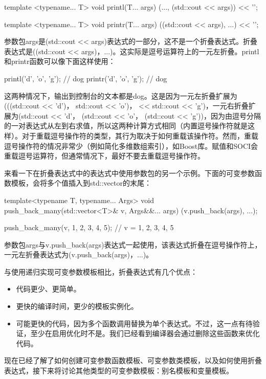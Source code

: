 \begin{cpp}
template <typename... T>
void printl(T... args)
{
	(..., (std::cout << args)) << '\n';
}

template <typename... T>
void printr(T... args)
{
	((std::cout << args), ...) << '\n';
}
\end{cpp}

参数包args是(std::cout <{}< args)表达式的一部分，这不是一个折叠表达式。折叠表达式是((std::cout <{}< args)，...)。这实际是逗号运算符上的一元左折叠。printl和printr函数可以像下面这样使用：

\begin{cpp}
printl('d', 'o', 'g'); // dog
printr('d', 'o', 'g'); // dog
\end{cpp}

这两种情况下，输出到控制台的文本都是dog。这是因为一元左折叠扩展为(((std::cout <{}< 'd')， std::cout <{}< 'o')， << std::cout <{}< 'g')，一元右折叠扩展为(std::cout <{}< 'd'， (std::cout <{}< 'o'， (std::cout <{}< 'g'))，因为由逗号分隔的一对表达式从左到右求值，所以这两种计算方式相同（内置逗号操作符就是这样）。对于重载逗号操作符的类型，其行为取决于如何重载该操作符。然而，重载逗号操作符的情况非常少（例如简化多维数组索引），如Boost库。赋值和SOCI会重载逗号运算符，但通常情况下，最好不要去重载逗号操作符。

来看一下在折叠表达式中的表达式中使用参数包的另一个示例。下面的可变参数函数模板，会将多个值插入到std::vector的末尾：

\begin{cpp}
template<typename T, typename... Args>
void push_back_many(std::vector<T>& v, Args&&... args)
{
	(v.push_back(args), ...);
}

push_back_many(v, 1, 2, 3, 4, 5); // v = {1, 2, 3, 4, 5}
\end{cpp}

参数包args与v.push\_back(args)表达式一起使用，该表达式折叠在逗号操作符上，一元左折叠表达式为(v.push\_back(args)，...)。

与使用递归实现可变参数模板相比，折叠表达式有几个优点：

\begin{itemize}
  \item 代码更少、更简单。

  \item 更快的编译时间，更少的模板实例化。

  \item 可能更快的代码，因为多个函数调用替换为单个表达式。不过，这一点有待验证，至少在启用优化时不是。我们已经看到编译器会通过删除这些函数来优化代码。
\end{itemize}

现在已经了解了如何创建可变参数函数模板、可变参数类模板，以及如何使用折叠表达式，接下来将讨论其他类型的可变参数模板：别名模板和变量模板。




















